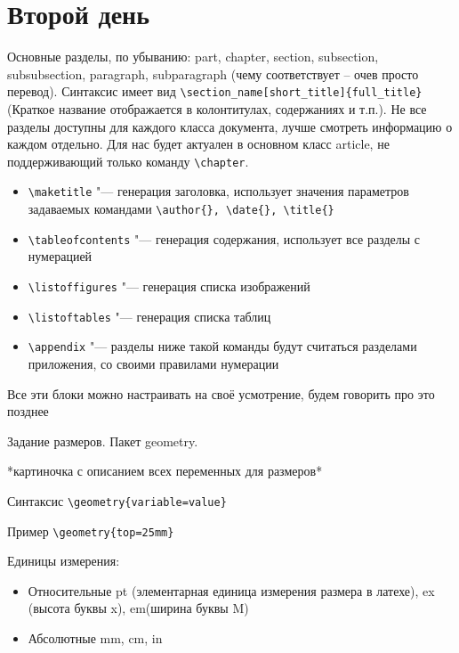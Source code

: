 \documentclass[a4paper, 12pt]{article}
\begin{document}
\section{Второй день}
Основные разделы, по убыванию: part, chapter, section, subsection, subsubsection, paragraph, subparagraph (чему соответствует – очев просто перевод). Синтаксис имеет вид \verb|\section_name[short_title]{full_title}| (Краткое название отображается в колонтитулах, содержаниях и т.п.). Не все разделы доступны для каждого класса документа, лучше смотреть информацию о каждом отдельно. Для нас будет актуален в основном класс article, не поддерживающий только команду \verb|\chapter|.
\begin{itemize}
	\item \verb|\maketitle| "--- генерация заголовка, использует значения параметров задаваемых командами \verb|\author{}, \date{}, \title{}|
	\item \verb|\tableofcontents| "--- генерация содержания, использует все разделы с нумерацией
	\item \verb|\listoffigures| "--- генерация списка изображений
	\item \verb|\listoftables| "--- генерация списка таблиц
	\item \verb|\appendix| "--- разделы ниже такой команды будут считаться разделами приложения, со своими правилами нумерации
\end{itemize}
Все эти блоки можно настраивать на своё усмотрение, будем говорить про это позднее

Задание размеров. Пакет geometry. 
 
*картиночка с описанием всех переменных для размеров*

Синтаксис \verb|\geometry{variable=value}|

Пример \verb|\geometry{top=25mm}|

Единицы измерения:
\begin{itemize}
	\item  Относительные pt (элементарная единица измерения размера в латехе), ex (высота буквы x), em(ширина буквы M)
	\item Абсолютные mm, cm, in
\end{itemize}
\end{document}
